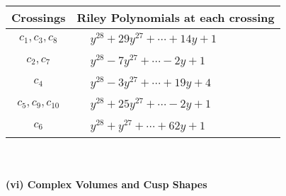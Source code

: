 \documentclass[1p]{elsarticle_modified}
\theoremstyle{definition}
\begin{document}
\begin{tabular}{m{50pt}|m{274pt}}
Crossings & \hspace{64pt}Riley Polynomials at each crossing \\
\hline $$\begin{aligned}c_{1},c_{3},c_{8}\end{aligned}$$&$\begin{aligned}
&y^{28}+29 y^{27}+\cdots+14 y+1
\end{aligned}$\\
\hline $$\begin{aligned}c_{2},c_{7}\end{aligned}$$&$\begin{aligned}
&y^{28}-7 y^{27}+\cdots-2 y+1
\end{aligned}$\\
\hline $$\begin{aligned}c_{4}\end{aligned}$$&$\begin{aligned}
&y^{28}-3 y^{27}+\cdots+19 y+4
\end{aligned}$\\
\hline $$\begin{aligned}c_{5},c_{9},c_{10}\end{aligned}$$&$\begin{aligned}
&y^{28}+25 y^{27}+\cdots-2 y+1
\end{aligned}$\\
\hline $$\begin{aligned}c_{6}\end{aligned}$$&$\begin{aligned}
&y^{28}+y^{27}+\cdots+62 y+1
\end{aligned}$\\
\hline
\end{tabular}\\~\\
\newpage\flushleft \textbf{(vi) Complex Volumes and Cusp Shapes}
\end{document}
